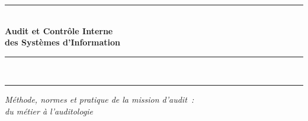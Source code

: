 \begin{titlepage}
\vspace*{0.6cm}

\begin{center}
    {\color{CouleurPrimaire}\rule{0.85\textwidth}{1.2pt}}\\[1.2ex]
    {\fontsize{26}{32}\selectfont\bfseries\color{CouleurPrimaire}
        Audit et Contrôle Interne\\[0.4ex]
        des Systèmes d'Information}\\[0.8ex]
    {\color{CouleurAccent}\rule{0.85\textwidth}{2pt}}\\[0.5ex]
    {\color{CouleurPrimaire}\rule{0.85\textwidth}{0.5pt}}
\end{center}

\vspace{0.8cm}

\begin{center}
    {\fontsize{13}{16}\selectfont\itshape\color{CouleurSecondaire}
        Méthode, normes et pratique de la mission d'audit~:\\
        du métier à l'auditologie}
\end{center}

\vspace{0.5cm}

\begin{center}
\end{center}

\vspace{1.0cm}


\end{titlepage}
